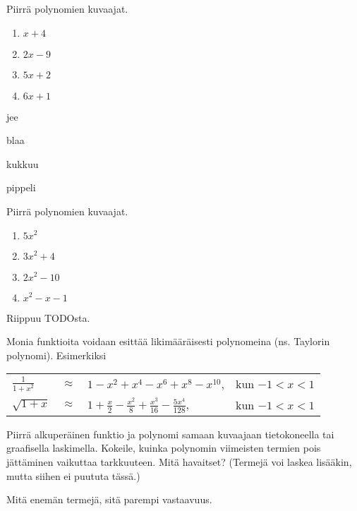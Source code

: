 \begin{tehtava}
    Piirrä polynomien kuvaajat.
    \begin{enumerate}
        \item $x+4$
        \item $2x-9$
        \item $5x+2$
        \item $6x+1$
    \end{enumerate}
    \begin{vastaus}
        \item jee
        \item blaa
        \item kukkuu
        \item pippeli
    \end{vastaus}
\end{tehtava}

\begin{tehtava}
    Piirrä polynomien kuvaajat.
    \begin{enumerate}
        \item $5x^2$
        \item $3x^2+4$
        \item $2x^2-10$
        \item $x^2-x-1$
    \end{enumerate}
    \begin{vastaus}
        Riippuu TODOsta.
    \end{vastaus}
\end{tehtava}

\begin{tehtava}
	Monia funktioita voidaan esittää likimääräisesti polynomeina (ns. Taylorin polynomi). Esimerkiksi

	\begin{tabular}{lcll}
	$\frac{1}{1+x^2}$ &$\approx$ & $1-x^2+x^4-x^6+x^8-x^{10}$, & kun $-1<x<1$ \\
	$\sqrt{1+x}$ & $\approx $ & $ 1+\frac{x}{2}
	-\frac{x^2}{8}+\frac{x^3}{16}-\frac{5x^4}{128}$, & kun $-1<x<1$
	\end{tabular}

	Piirrä alkuperäinen funktio ja polynomi samaan kuvaajaan tietokoneella tai graafisella laskimella. Kokeile, kuinka polynomin viimeisten termien pois jättäminen vaikuttaa tarkkuuteen. Mitä havaitset? (Termejä voi laskea lisääkin, mutta siihen ei puututa tässä.)

	\begin{vastaus}
		Mitä enemän termejä, sitä parempi vastaavuus.
	\end{vastaus}
\end{tehtava}
